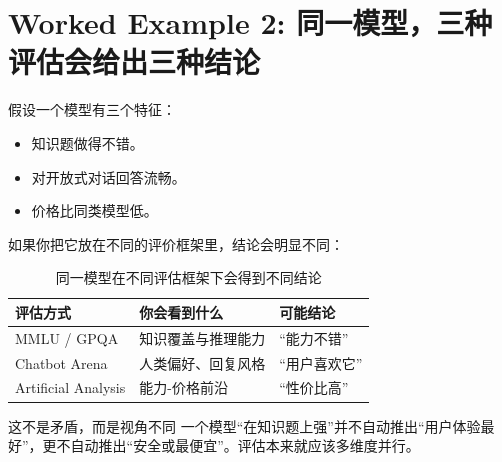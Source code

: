 \section{Worked Example 2: 同一模型，三种评估会给出三种结论}

假设一个模型有三个特征：
\begin{itemize}
    \item 知识题做得不错。
    \item 对开放式对话回答流畅。
    \item 价格比同类模型低。
\end{itemize}

如果你把它放在不同的评价框架里，结论会明显不同：

\begin{table}[H]
\centering
\begin{tabular}{p{3.3cm}p{4.2cm}p{5.4cm}}
\toprule
\textbf{评估方式} & \textbf{你会看到什么} & \textbf{可能结论} \\
\midrule
MMLU / GPQA & 知识覆盖与推理能力 & “能力不错” \\
Chatbot Arena & 人类偏好、回复风格 & “用户喜欢它” \\
Artificial Analysis & 能力-价格前沿 & “性价比高” \\
\bottomrule
\end{tabular}
\caption{同一模型在不同评估框架下会得到不同结论}
\end{table}

\begin{importantbox}{这不是矛盾，而是视角不同}
一个模型“在知识题上强”并不自动推出“用户体验最好”，更不自动推出“安全或最便宜”。评估本来就应该多维度并行。
\end{importantbox}

